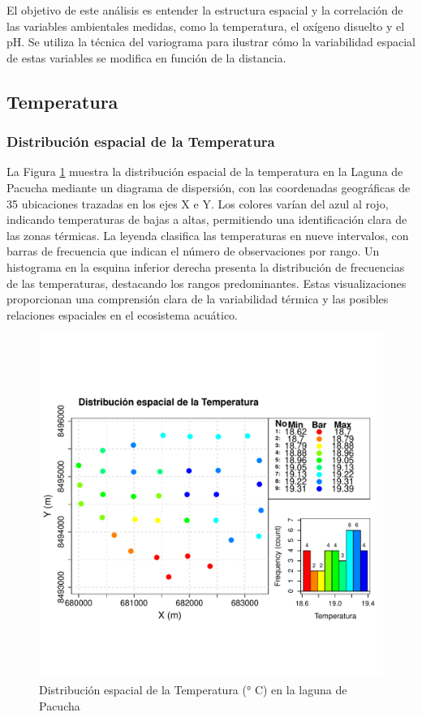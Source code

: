 El objetivo de este análisis es entender la estructura espacial y la correlación de las variables ambientales medidas, como la temperatura, el oxígeno disuelto y el pH. Se utiliza la técnica del variograma para ilustrar cómo la variabilidad espacial de estas variables se modifica en función de la distancia.


\subsection{Temperatura}
\subsubsection{Distribución espacial de la Temperatura}

La Figura \ref{fig:enter-labeld} muestra la distribución espacial de la temperatura en la Laguna de Pacucha mediante un diagrama de dispersión, con las coordenadas geográficas de 35 ubicaciones trazadas en los ejes X e Y. Los colores varían del azul al rojo, indicando temperaturas de bajas a altas, permitiendo una identificación clara de las zonas térmicas. La leyenda clasifica las temperaturas en nueve intervalos, con barras de frecuencia que indican el número de observaciones por rango. Un histograma en la esquina inferior derecha presenta la distribución de frecuencias de las temperaturas, destacando los rangos predominantes. Estas visualizaciones proporcionan una comprensión clara de la variabilidad térmica y las posibles relaciones espaciales en el ecosistema acuático.
\begin{figure} [H]
    \centering
    \includegraphics[width=0.8\linewidth]{Figuras_AED//VARIOGRAFICO/tem_Spatial_Distr.pdf}
    \caption{Distribución espacial de la Temperatura (° C) en la laguna de Pacucha}
    \label{fig:enter-labeld}
\end{figure}




